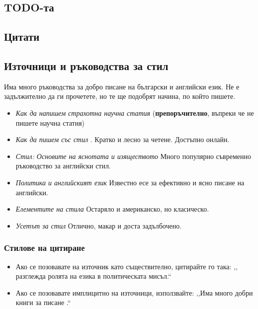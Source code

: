 \subsection{TODO-та}


\subsection{Цитати}


\subsection{Източници и ръководства за стил}
Има много ръководства за добро писане на български и английски език. Не е
задължително да ги прочетете, но те ще подобрят начина, по който пишете.

\begin{itemize}
    \item
    \emph{Как да напишем страхотна научна статия} \cite{Pey17} (\textbf{препоръчително}, въпреки че не пишете научна статия)
    \item
    \emph{Как да пишем със стил} \cite{Von80}. Кратко и лесно за четене. Достъпно онлайн.
    \item
    \emph{Стил: Основите на яснотата и изяществото} \cite{Wil09} Много популярно съвременно ръководство за английски стил.
    \item
    \emph{Политика и английският език} \cite{Orw68} Известно есе за ефективно и ясно писане на английски.
    \item
    \emph{Елементите на стила} \cite{StrWhi07} Остаряло и американско, но класическо.
    \item
    \emph{Усетът за стил} \cite{Pin15} Отлично, макар и доста задълбочено.
\end{itemize}

\subsubsection{Стилове на цитиране}

\begin{itemize}
\item Ако се позовавате на източник като съществително, цитирайте го така: ,,\citet{Orw68} разглежда ролята на езика в политическата мисъл.``
\item Ако се позовавате имплицитно на източници, използвайте: ,,Има много добри книги за писане \citep{Orw68, Wil09, Pin15}.``
\end{itemize}


